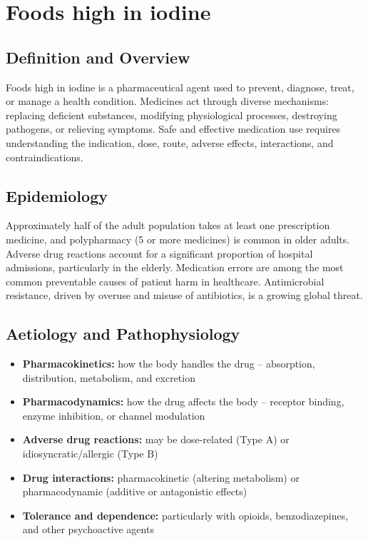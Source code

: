 \chapter{Foods high in iodine}

\section*{Definition and Overview}
Foods high in iodine is a pharmaceutical agent used to prevent, diagnose, treat, or manage a health condition. Medicines act through diverse mechanisms: replacing deficient substances, modifying physiological processes, destroying pathogens, or relieving symptoms. Safe and effective medication use requires understanding the indication, dose, route, adverse effects, interactions, and contraindications.

\section*{Epidemiology}
Approximately half of the adult population takes at least one prescription medicine, and polypharmacy (5 or more medicines) is common in older adults. Adverse drug reactions account for a significant proportion of hospital admissions, particularly in the elderly. Medication errors are among the most common preventable causes of patient harm in healthcare. Antimicrobial resistance, driven by overuse and misuse of antibiotics, is a growing global threat.

\section*{Aetiology and Pathophysiology}
\begin{itemize}
    \item \textbf{Pharmacokinetics:} how the body handles the drug -- absorption, distribution, metabolism, and excretion
    \item \textbf{Pharmacodynamics:} how the drug affects the body -- receptor binding, enzyme inhibition, or channel modulation
    \item \textbf{Adverse drug reactions:} may be dose-related (Type A) or idiosyncratic/allergic (Type B)
    \item \textbf{Drug interactions:} pharmacokinetic (altering metabolism) or pharmacodynamic (additive or antagonistic effects)
    \item \textbf{Tolerance and dependence:} particularly with opioids, benzodiazepines, and other psychoactive agents
\end{itemize}

